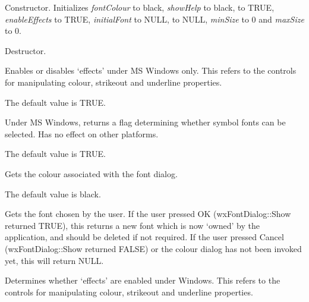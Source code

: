 

Constructor. Initializes {\it fontColour} to black, {\it showHelp} to black,
 to TRUE, {\it enableEffects} to TRUE, {\it initialFont} to NULL,
 to NULL, {\it minSize} to 0 and {\it maxSize} to 0.



Destructor.



Enables or disables `effects' under MS Windows only. This refers to the
controls for manipulating colour, strikeout and underline properties.

The default value is TRUE.



Under MS Windows, returns a flag determining whether symbol fonts can be selected. Has no
effect on other platforms.

The default value is TRUE.



Gets the colour associated with the font dialog.

The default value is black.



Gets the font chosen by the user. If the user pressed OK (wxFontDialog::Show returned TRUE), this returns
a new font which is now `owned' by the application, and should be deleted
if not required. If the user pressed Cancel (wxFontDialog::Show returned FALSE) or
the colour dialog has not been invoked yet, this will return NULL.



Determines whether `effects' are enabled under Windows. This refers to the
controls for manipulating colour, strikeout and underline properties.

